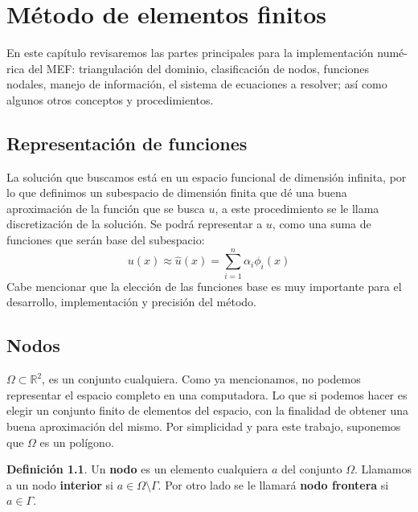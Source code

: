 \documentclass[12pt,spanish,oneside]{book}
\theoremstyle{plain}
\numberwithin{equation}{chapter}
\theoremstyle{definition}
\newtheorem{defi}{Definici\'{o}n}[chapter]
\theoremstyle{remark}
\newcommand{\re}{\mathbb{R}}
\begin{document}
\chapter{Método de elementos finitos}
En este capítulo revisaremos las partes principales para la implementación numé-rica del MEF: triangulación del dominio, clasificación de nodos, funciones nodales, manejo de información, el sistema de ecuaciones a resolver; así como algunos otros conceptos y procedimientos.
\section{Representación de funciones}
La solución que buscamos está en un espacio funcional de dimensión infinita, por lo que definimos un subespacio de dimensión finita que dé una buena aproximación de la función que se busca $u$, a este procedimiento se le llama discretización de la solución. Se podrá representar a $u$, como una suma de funciones que serán base del subespacio:
\begin{equation*}
u(x)\approx\hat{u}(x)= \sum_{i=1}^n \alpha_i \phi_i(x)
\end{equation*}
Cabe mencionar que la elección de las funciones base es muy importante para el desarrollo, implementación y precisión del método.

 

\section{Nodos}\label{CapNodos}

$\Omega\subset\re^2$, es un conjunto cualquiera. Como ya mencionamos, no podemos representar el espacio completo en una computadora. Lo que si podemos hacer es elegir un conjunto finito de elementos del espacio, con la finalidad de obtener una buena aproximación del mismo. Por simplicidad y para este trabajo, suponemos que $\Omega$ es un polígono.

\begin{defi}

Un \textbf{nodo} es un elemento cualquiera $a$ del conjunto $\Omega$. Llamamos a un nodo \textbf{interior} si $a\in \Omega \setminus\Gamma$. Por otro lado se le llamará \textbf{nodo frontera} si $a\in \Gamma$.

\end{defi}
\end{document}
